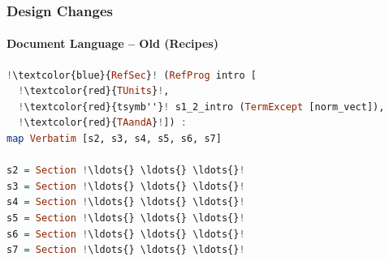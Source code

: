 \documentclass{beamer}
\begin{document}

%
%
%
%

\begin{frame}[fragile]

\frametitle{Design Changes}
\framesubtitle{Document Language -- Old (Recipes)}

\begin{lstlisting}[language=Haskell, frame=single, showstringspaces=false, basicstyle=\scriptsize, escapechar=!]
!\textcolor{blue}{RefSec}! (RefProg intro [
  !\textcolor{red}{TUnits}!, 
  !\textcolor{red}{tsymb''}! s1_2_intro (TermExcept [norm_vect]),
  !\textcolor{red}{TAandA}!]) : 
map Verbatim [s2, s3, s4, s5, s6, s7]

s2 = Section !\ldots{} \ldots{} \ldots{}!
s3 = Section !\ldots{} \ldots{} \ldots{}!
s4 = Section !\ldots{} \ldots{} \ldots{}!
s5 = Section !\ldots{} \ldots{} \ldots{}!
s6 = Section !\ldots{} \ldots{} \ldots{}!
s7 = Section !\ldots{} \ldots{} \ldots{}!

\end{lstlisting} 
\end{frame}

\end{document}
